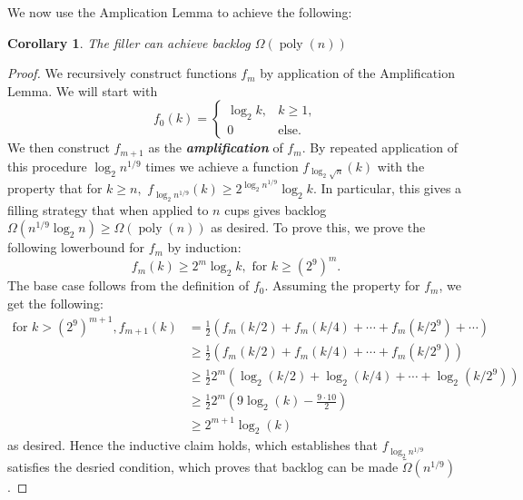 \documentclass{article}[11pt]
\newcommand{\defn}[1]{{\textit{\textbf{\boldmath #1}}}}
\DeclareMathOperator{\poly}{\text{poly}}
\newtheorem{corollary}{Corollary}
\begin{document}
We now use the Amplication Lemma to achieve the following:
\begin{corollary}
  The filler can achieve backlog $\Omega(\poly(n))$
\end{corollary}
\begin{proof}
  We recursively construct functions $f_m$ by application of the Amplification
  Lemma. We will start with 
  $$f_0(k) = 
  \begin{cases} 
    \log_2 k, & k\geq 1, \\
    0 & \text{else.}
  \end{cases}$$
    We then construct $f_{m+1}$ as the
  \defn{amplification} of $f_m$.  
  By repeated application of this procedure $\log_2 n^{1/9}$ times we 
  achieve a function $f_{\log_2 \sqrt{n}}(k)$ with the property that for $k \geq n,$
  $f_{\log_2 n^{1/9}}(k) \geq 2^{\log_2 n^{1/9}} \log_2 k$. In particular, this gives a filling strategy 
  that when applied to $n$ cups gives backlog $\Omega(n^{1/9}\log_2 n) \ge \Omega(\poly(n))$ as desired.
  To prove this, we prove the following lowerbound for $f_m$ by induction:
  $$f_m(k) \geq 2^m \log_2 k, \text{ for } k \geq (2^9)^m.$$
  The base case follows from the definition of $f_0$. Assuming the property for $f_m$, we get the following:
  \begin{align}
    \text{for } k > (2^9)^{m+1}, f_{m+1}(k) &= \frac{1}{2}(f_m(k/2) + f_m(k/4) + \cdots + f_m(k/2^9) + \cdots)\\
  &\geq \frac{1}{2}(f_m(k/2) + f_m(k/4) + \cdots + f_m(k/2^9))\\
  &\geq \frac{1}{2}2^m(\log_2 (k/2) + \log_2(k/4) + \cdots + \log_2(k/2^9))\\
  &\geq \frac{1}{2}2^m(9\log_2 (k) - \frac{9 \cdot 10}{2}) \label{step:readydrop}\\
  &\geq 2^{m+1} \log_2(k) \label{step:dropped}
  \end{align}
  as desired. Hence the inductive claim holds, which establishes that $f_{\log_2
  n^{1/9}}$ satisfies the desried condition, which proves that backlog can be
  made $\tilde{\Omega}(n^{1/9})$.


\end{proof}
\end{document}

